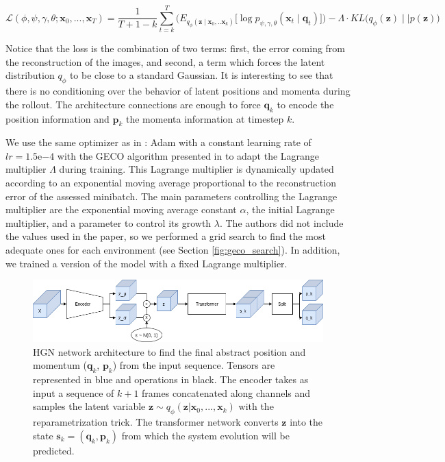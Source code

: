 \begin{equation}
    \mathcal{L} (\phi, \psi, \gamma, \theta; \bm{x}_0, ..., \bm{x}_T) = \frac{1}{T + 1 - k}
    \sum_{t=k}^T
    \Big(
    E_{q_\phi (\bm{z} \mid \bm{x}_0, .. \bm{x}_k)}
    \big[
    \log p_{\psi, \gamma, \theta} (\bm{x}_t \mid \bm{q}_t)
    \big]
    \Big)
    - \Lambda \cdot KL \big(q_\phi(\bm{z}) \mid \mid p(\bm{z})\big)
\label{eq:loss}
\end{equation}

Notice that the loss is the combination of two terms:
first, the error coming from the reconstruction of the images, and second, a term which forces the latent distribution $q_{\phi}$ to be close to a standard Gaussian.
It is interesting to see that there is no conditioning over the behavior of latent positions and momenta during the rollout.
The architecture connections are enough to force $\bm{q}_k$ to encode the position information and $\bm{p}_k$ the momenta information at timestep $k$. 

We use the same optimizer as in \cite{hgn}:
Adam \cite{adam} with a constant learning rate of $lr=1.5\mathrm{e}{-4}$ with the GECO algorithm presented in \cite{geco} to adapt the Lagrange multiplier $\Lambda$ during training.
This Lagrange multiplier is dynamically updated according to an exponential moving average proportional to the reconstruction error of the assessed minibatch.
The main parameters controlling the Lagrange multiplier are the exponential moving average constant $\alpha$, the initial Lagrange multiplier, and a parameter to control its growth $\lambda$.
The authors did not include the values used in the paper, so we performed a grid search to find the most adequate ones for each environment (see Section \ref{fig:geco_search}).
In addition, we trained a version of the model with a fixed Lagrange multiplier.

\begin{figure}[h]
\centering
\includegraphics[width=\textwidth]{pictures/HGN_Architecture.png}
\caption{HGN network architecture to find the final abstract position and momentum ($\bm{q}_k$, $\bm{p}_k$) from the input sequence. Tensors are represented in blue and operations in black. The encoder takes as input a sequence of $k+1$ frames concatenated along channels and samples the latent variable $\bm{z} \sim q_{\phi}(\bm{z} \vert \bm{x}_0, ..., \bm{x}_k)$ with the reparametrization trick. The transformer network converts $\bm{z}$ into the state $\bm{s}_k = (\bm{q}_k, \bm{p}_k)$ from which the system evolution will be predicted.}
\label{fig:initial_cond}
\end{figure}

